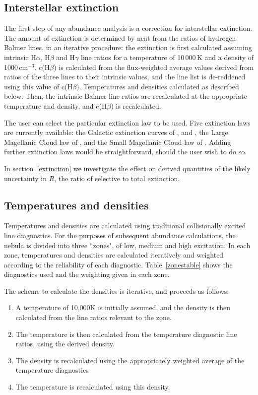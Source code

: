 \documentclass[useAMS,usenatbib]{mn2e}
\begin{document}
\subsection{Interstellar extinction}
\label{extinctionsection}
The first step of any abundance analysis is a correction for interstellar extinction.  The amount of extinction is determined by {\sc neat} from the ratios of hydrogen Balmer lines, in an iterative procedure: the extinction is first calculated assuming intrinsic H$\alpha$, H$\beta$ and H$\gamma$ line ratios for a temperature of 10\,000\,K and a density of 1000\,cm$^{-3}$.  c(H$\beta$) is calculated from the flux-weighted average values derived from ratios of the three lines to their intrinsic values, and the line list is de-reddened using this value of c(H$\beta)$.  Temperatures and densities calculated as described below.  Then, the intrinsic Balmer line ratios are recalculated at the appropriate temperature and density, and c(H$\beta$) is recalculated.

The user can select the particular extinction law to be used.  Five extinction laws are currently available: the Galactic extinction curves of \citet{1983MNRAS.203..301H}, \citet{1990ApJS...72..163F} and \citet{1989ApJ...345..245C}, the Large Magellanic Cloud law of \citet{1983MNRAS.203..301H}, and the Small Magellanic Cloud law of \citet{1984A&A...132..389P}.  Adding further extinction laws would be straightforward, should the user wish to do so.

In section~\ref{extinction} we investigate the effect on derived quantities of the likely uncertainty in $R$, the ratio of selective to total extinction.

\subsection{Temperatures and densities}

Temperatures and densities are calculated using traditional collisionally excited line diagnostics.  For the purposes of subsequent abundance calculations, the nebula is divided into three ``zones", of low, medium and high excitation.  In each zone, temperatures and densities are calculated iteratively and weighted according to the reliability of each diagnostic.  Table~\ref{zonestable} shows the diagnostics used and the weighting given in each zone.

The scheme to calculate the densities is iterative, and proceeds as follows:

\begin{enumerate}
\item A temperature of 10,000K is initially assumed, and the density is then calculated from the line ratios relevant to the zone.
\item The temperature is then calculated from the temperature diagnostic line ratios, using the derived density.
\item The density is recalculated using the appropriately weighted average of the temperature diagnostics
\item The temperature is recalculated using this density.
\end{enumerate}
\end{document}

